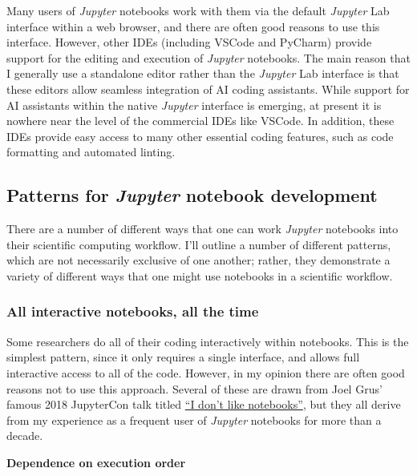 Many users of \textit{Jupyter} notebooks work with them via the default \textit{Jupyter} Lab interface within  a web browser, and there are often good reasons to use this interface. However, other IDEs (including VSCode and PyCharm) provide support for the editing and execution of \textit{Jupyter} notebooks.  The main reason that I generally use a standalone editor rather than the \textit{Jupyter} Lab interface is that these editors allow seamless integration of AI coding assistants.  While support for AI assistants within the native \textit{Jupyter} interface is emerging, at present it is nowhere near the level of the commercial IDEs like VSCode.  In addition, these IDEs provide easy access to many other essential coding features, such as code formatting and automated linting.

\subsection{Patterns for \textit{Jupyter} notebook development}

There are a number of different ways that one can work \textit{Jupyter} notebooks into their scientific computing workflow.  I'll outline a number of different patterns, which are not necessarily exclusive of one another; rather, they demonstrate a variety of different ways that one might use notebooks in a scientific workflow.

\subsubsection{All interactive notebooks, all the time}

Some researchers do all of their coding interactively within notebooks.  This is the simplest pattern, since it only requires a single interface, and allows full interactive access to all of the code.  However, in my opinion there are often good reasons not to use this approach.  Several of these are drawn from Joel Grus' famous 2018 JupyterCon talk titled \href{https://docs.google.com/presentation/d/1n2RlMdmv1p25Xy5thJUhkKGvjtV-dkAIsUXP-AL4ffI/preview?slide=id.g362da58057\_0\_1}{``I don't like notebooks''}, but they all derive from my experience as a frequent user of \textit{Jupyter} notebooks for more than a decade.

\textbf{Dependence on execution order}

